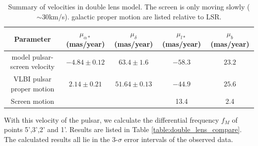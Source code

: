 \documentclass[useAMS,usenatbib]{mn2e}
\begin{document}
\begin{table}
\centering
\begin{tabular}{ccccc}
\hline
Parameter & $\mu_{\alpha*}$(mas/year) & $\mu_{\delta}$(mas/year) & $\mu_{l*}$(mas/year) & $\mu_b$ (mas/year)\\
\hline
model pulsar-screen velocity & $-4.84\pm 0.12$ & $63.4\pm 1.6$ & $-58.3$ & $23.2$ \\
VLBI pulsar proper motion & $2.14 \pm 0.21$ & $51.64\pm 0.13$ &
                                                                $-44.9$ & $25.6$\\
Screen motion &  &  & 13.4 & 2.4 \\
\hline
\end{tabular}
\caption{Summary of velocities in double lens model. The screen is
  only moving slowly ($\sim 30$km/s). 
 galactic proper motion are listed relative to LSR.
}
\label{Table:velocity}
\end{table}



With this velocity of the pulsar, we calculate the differential
frequency $f_M$ of points 5',3',2' and 1'. Results are listed in Table
\ref{table:double_lens_compare}. The calculated results all lie in the
3-$\sigma$ error intervals of the observed data. 
\end{document}
